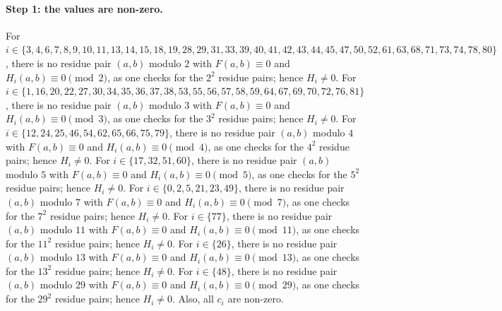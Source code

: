 \documentclass[11pt]{article}
\begin{document}
\paragraph{Step 1: the values are non-zero.} For $i\in\{3,\allowbreak 4,\allowbreak 6,\allowbreak 7,\allowbreak 8,\allowbreak 9,\allowbreak 10,\allowbreak 11,\allowbreak 13,\allowbreak 14,\allowbreak 15,\allowbreak 18,\allowbreak 19,\allowbreak 28,\allowbreak 29,\allowbreak 31,\allowbreak 33,\allowbreak 39,\allowbreak 40,\allowbreak 41,\allowbreak 42,\allowbreak 43,\allowbreak 44,\allowbreak 45,\allowbreak 47,\allowbreak 50,\allowbreak 52,\allowbreak 61,\allowbreak 63,\allowbreak 68,\allowbreak 71,\allowbreak 73,\allowbreak 74,\allowbreak 78,\allowbreak 80\}$, there is no residue pair $(a,b)$ modulo $2$ with $F(a,b)\equiv0$ and $H_i(a,b)\equiv0\pmod{2}$, as one checks for the $2^2$ residue pairs; hence $H_i\neq0$. For $i\in\{1,\allowbreak 16,\allowbreak 20,\allowbreak 22,\allowbreak 27,\allowbreak 30,\allowbreak 34,\allowbreak 35,\allowbreak 36,\allowbreak 37,\allowbreak 38,\allowbreak 53,\allowbreak 55,\allowbreak 56,\allowbreak 57,\allowbreak 58,\allowbreak 59,\allowbreak 64,\allowbreak 67,\allowbreak 69,\allowbreak 70,\allowbreak 72,\allowbreak 76,\allowbreak 81\}$, there is no residue pair $(a,b)$ modulo $3$ with $F(a,b)\equiv0$ and $H_i(a,b)\equiv0\pmod{3}$, as one checks for the $3^2$ residue pairs; hence $H_i\neq0$. For $i\in\{12,\allowbreak 24,\allowbreak 25,\allowbreak 46,\allowbreak 54,\allowbreak 62,\allowbreak 65,\allowbreak 66,\allowbreak 75,\allowbreak 79\}$, there is no residue pair $(a,b)$ modulo $4$ with $F(a,b)\equiv0$ and $H_i(a,b)\equiv0\pmod{4}$, as one checks for the $4^2$ residue pairs; hence $H_i\neq0$. For $i\in\{17,\allowbreak 32,\allowbreak 51,\allowbreak 60\}$, there is no residue pair $(a,b)$ modulo $5$ with $F(a,b)\equiv0$ and $H_i(a,b)\equiv0\pmod{5}$, as one checks for the $5^2$ residue pairs; hence $H_i\neq0$. For $i\in\{0,\allowbreak 2,\allowbreak 5,\allowbreak 21,\allowbreak 23,\allowbreak 49\}$, there is no residue pair $(a,b)$ modulo $7$ with $F(a,b)\equiv0$ and $H_i(a,b)\equiv0\pmod{7}$, as one checks for the $7^2$ residue pairs; hence $H_i\neq0$. For $i\in\{77\}$, there is no residue pair $(a,b)$ modulo $11$ with $F(a,b)\equiv0$ and $H_i(a,b)\equiv0\pmod{11}$, as one checks for the $11^2$ residue pairs; hence $H_i\neq0$. For $i\in\{26\}$, there is no residue pair $(a,b)$ modulo $13$ with $F(a,b)\equiv0$ and $H_i(a,b)\equiv0\pmod{13}$, as one checks for the $13^2$ residue pairs; hence $H_i\neq0$. For $i\in\{48\}$, there is no residue pair $(a,b)$ modulo $29$ with $F(a,b)\equiv0$ and $H_i(a,b)\equiv0\pmod{29}$, as one checks for the $29^2$ residue pairs; hence $H_i\neq0$. Also, all $c_i$ are non-zero.
\end{document}
